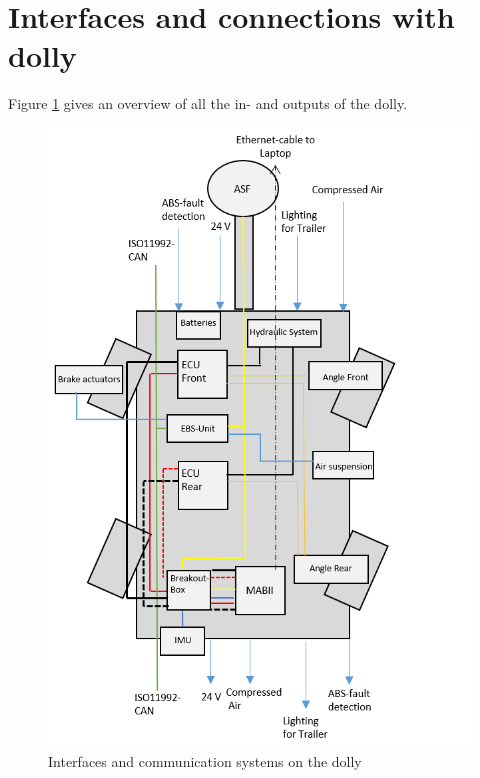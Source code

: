 \documentclass[ExampleMasters.tex]{subfiles}
\begin{document}
\section{Interfaces and connections with dolly}
\label{sec:interface_with_dolly}
Figure \ref{fig:dolly_interfaces} gives an overview of all the in- and outputs of the dolly.

\begin{figure}[!htb]

	\includegraphics[width=0.9\linewidth]{figures/ExampleCover}
	\caption{Interfaces and communication systems on the dolly}
	\label{fig:dolly_interfaces}
\end{figure}
\end{document}
